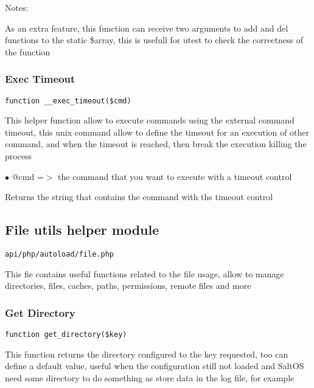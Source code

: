 \documentclass[a4paper]{article}
\begin{document}
Notes:

As an extra feature, this function can receive two arguments
to add and del functions to the static \$array, this is usefull
for utest to check the correctness of the function

\hypertarget{toc127}{}
\subsubsection{Exec Timeout}

\begin{lstlisting}
function __exec_timeout($cmd)
\end{lstlisting}

This helper function allow to execute commands using the external
command timeout, this unix command allow to define the timeout for
an execution of other command, and when the timeout is reached, then
break the execution killing the process

\begin{compactitem}
\item[\color{myblue}$\bullet$] @cmd =$>$ the command that you want to execute with a timeout control
\end{compactitem}

Returns the string that contains the command with ths timeout control

\hypertarget{toc128}{}
\subsection{File utils helper module}

\begin{lstlisting}
api/php/autoload/file.php
\end{lstlisting}

This fie contains useful functions related to the file usage, allow to manage directories, files,
caches, paths, permissions, remote files and more

\hypertarget{toc129}{}
\subsubsection{Get Directory}

\begin{lstlisting}
function get_directory($key)
\end{lstlisting}

This function returns the directory configured to the key requested, too can define a default
value, useful when the configuration still not loaded and SaltOS need some directory to do
something as store data in the log file, for example
\end{document}
